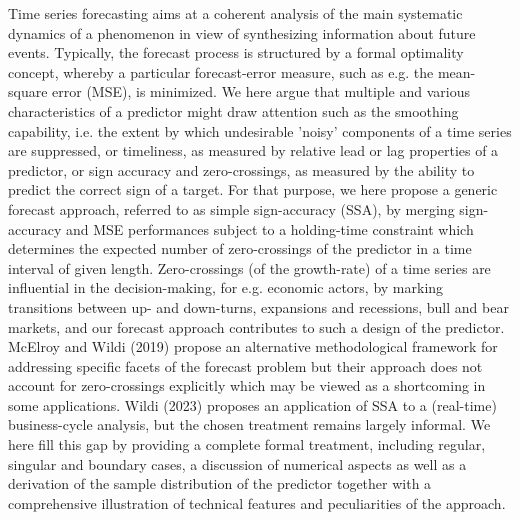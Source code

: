 \documentclass[a4paper]{article}
\begin{document}
Time series forecasting aims at a coherent analysis of the main systematic dynamics of a phenomenon in view of synthesizing information about future events. Typically, the forecast process is structured by a formal optimality concept, whereby a particular forecast-error measure, such as e.g. the mean-square error (MSE), is minimized. We here argue that multiple and various characteristics of a predictor might draw attention such as the smoothing capability, i.e. the extent by which undesirable 'noisy' components of a time series are suppressed, or timeliness, as measured by relative lead or lag properties of a predictor, or sign accuracy and zero-crossings, as measured by the ability to predict the correct sign of a target. For that purpose, we here propose a generic forecast approach, referred to as simple sign-accuracy (SSA), by merging sign-accuracy and MSE performances subject to a holding-time constraint which  determines the expected number of zero-crossings of the predictor in a time interval of given length. Zero-crossings (of the growth-rate) of a time series are influential in the decision-making, for e.g. economic actors, by marking transitions between up- and down-turns, expansions and recessions, bull and bear markets, and our forecast approach contributes to such a design of the predictor. %
McElroy and Wildi (2019) propose an alternative methodological framework for addressing specific facets of the forecast problem but their approach does not account for zero-crossings explicitly which may be viewed as a shortcoming in some applications. Wildi (2023) proposes an application of SSA to a (real-time) business-cycle analysis, but the chosen treatment remains  largely informal. We here fill this gap by providing a complete formal treatment, including regular, singular and boundary cases, a discussion of numerical aspects as well as a derivation of the sample distribution of the predictor together with a comprehensive illustration of technical  features and peculiarities of the approach. \\
\end{document}
